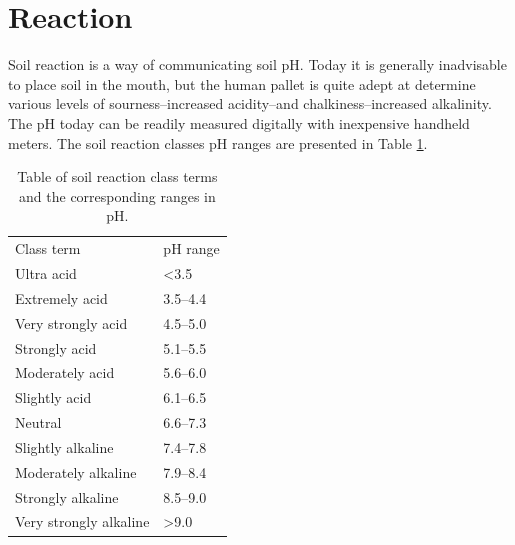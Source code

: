 \documentclass{article}
\begin{document}
\section{Reaction}
\label{reaction}

Soil reaction is a way of communicating soil pH. Today it is generally inadvisable to place soil in the mouth, but the human pallet is quite adept at determine various levels of sourness–increased acidity–and chalkiness–increased alkalinity. The pH today can be readily measured digitally with inexpensive handheld meters. The soil reaction classes pH ranges are presented in Table \ref{tab:reactionclass}.

\begin{table}[!htbp]
\centering
\caption{Table of soil reaction class terms and the corresponding ranges in pH.}
\label{tab:reactionclass}
\begin{tabular}{ll}
\hline
Class term             & pH range         \\ \hhline{==}
Ultra acid             & \textless 3.5    \\
Extremely acid         & 3.5–4.4          \\
Very strongly acid     & 4.5–5.0          \\
Strongly acid          & 5.1–5.5          \\
Moderately acid        & 5.6–6.0          \\
Slightly acid          & 6.1–6.5          \\
Neutral                & 6.6–7.3          \\
Slightly alkaline      & 7.4–7.8          \\
Moderately alkaline    & 7.9–8.4          \\
Strongly alkaline      & 8.5–9.0          \\
Very strongly alkaline & \textgreater 9.0 \\
\hline
\end{tabular}
\end{table}

\end{document}
